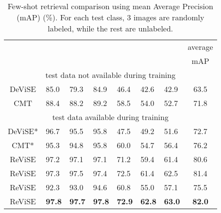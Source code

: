{{}
\begin{table}[t!]
\centering
\caption{\footnotesize Few-shot retrieval comparison using mean Average Precision (mAP) (\%). For each test class, 3 images are randomly labeled, while the rest are unlabeled. }
\vspace{1mm}
\scalebox{0.72}
{
\begin{tabular}{|c||lll||lll||c|}
\hline
 & \multicolumn{3}{c||}{}                                                      & \multicolumn{3}{c||}{}                                                     & average                          \\
                        & \multicolumn{1}{c}{} & \multicolumn{1}{c}{} & \multicolumn{1}{c||}{} & \multicolumn{1}{c}{} & \multicolumn{1}{c}{} & \multicolumn{1}{c||}{} & mAP \\  \hline \hline
\multicolumn{8}{|c|}{test data not available during training}                                                                                                                                                                                        \\ \hline \hline
DeViSE \cite{frome2013devise}     &   85.0  &   79.3  &  84.9  &   46.4    &    42.6   & 42.9       &  63.5  \\
CMT \cite{socher2013zero}    &  88.4  &    88.2    &  89.2   &    58.5     &    54.0   &    52.7   &  71.8   \\ \hline \hline
\multicolumn{8}{|c|}{test data available during training}                                                                                                                                                                                        \\ \hline \hline
DeViSE* \cite{frome2013devise}      &      96.7   &     95.5      &   95.8     &47.5     &   49.2   &   51.6    & 72.7   \\
CMT* \cite{socher2013zero}    &   95.3   &    94.8       &  95.8  &   60.0  &  54.7    &    56.4  &  76.2   \\
ReViSE &  97.2   &   97.1     &    97.1   &   71.2   &   59.4   &   61.4  &    80.6     \\
ReViSE &   97.3    &   97.5    &   97.4      &   72.5    &   61.4   &  62.5    &   81.4  \\
ReViSE &  92.3  & 93.0  &  94.6    &  60.8 &  55.0 &  57.1   &  75.5 \\
ReViSE   &     {\bf 97.8}   &  {\bf 97.7}    &  {\bf 97.8}  &    {\bf 72.9}  &    {\bf 62.8}  &   {\bf 63.0}    &    {\bf 82.0} \\ \hline
\end{tabular}
}
\vspace{-4mm}
\label{tbl:few_retriev}
\end{table}



}
